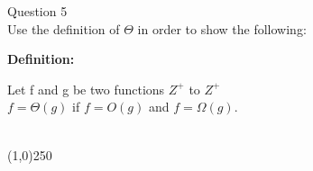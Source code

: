 \documentclass[OPONE]{example}
\begin{document}

\noindent Question 5 \\

Use the definition of $\Theta$ in order to show the following: \\

\begin{list}{}{}
	
	\item {\textbf{Definition:}} 
	
	Let f and g be two functions \textbf{$Z^{+}$} to \textbf{$Z^{+}$} \\ 
	$f = \Theta(g)$ if $f = O(g)$ and $f = \Omega(g)$. \\
	\\
	
	\begin{center}
		\line(1,0){250}
	\end{center}


\end{list}
\end{document}
